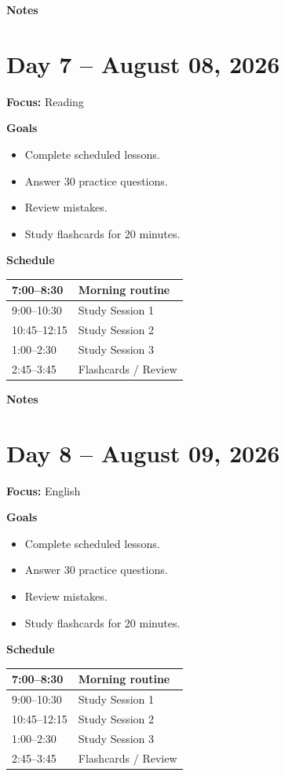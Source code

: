 \vspace{1em}
\textbf{Notes}

\vspace{8cm}

\newpage

\section*{Day 7 -- August 08, 2026}
\textbf{Focus:} Reading

\textbf{Goals}
\begin{itemize}
\item Complete scheduled lessons.
\item Answer 30 practice questions.
\item Review mistakes.
\item Study flashcards for 20 minutes.
\end{itemize}

\textbf{Schedule}
\begin{tabular}{|p{4cm}|p{10cm}|}\hline
7:00--8:30 & Morning routine \\\hline
9:00--10:30 & Study Session 1 \\\hline
10:45--12:15 & Study Session 2 \\\hline
1:00--2:30 & Study Session 3 \\\hline
2:45--3:45 & Flashcards / Review \\\hline
\end{tabular}

\vspace{1em}
\textbf{Notes}

\vspace{8cm}

\newpage

\section*{Day 8 -- August 09, 2026}
\textbf{Focus:} English

\textbf{Goals}
\begin{itemize}
\item Complete scheduled lessons.
\item Answer 30 practice questions.
\item Review mistakes.
\item Study flashcards for 20 minutes.
\end{itemize}

\textbf{Schedule}
\begin{tabular}{|p{4cm}|p{10cm}|}\hline
7:00--8:30 & Morning routine \\\hline
9:00--10:30 & Study Session 1 \\\hline
10:45--12:15 & Study Session 2 \\\hline
1:00--2:30 & Study Session 3 \\\hline
2:45--3:45 & Flashcards / Review \\\hline
\end{tabular}

